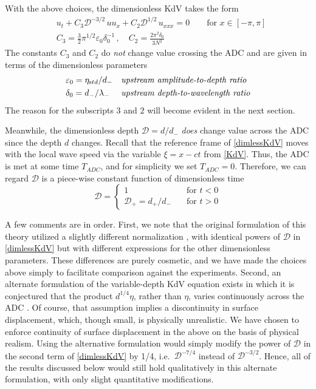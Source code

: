 \documentclass[11pt]{article}
\newcommand{\eps}{\varepsilon}
\newcommand{\etastd}{\eta_{\text std}}
\newcommand{\depth}{d}
\newcommand{\dup}{\depth_{-}}
\newcommand{\ddn}{\depth_{+}}
\newcommand{\lam}{\lambda}
\newcommand{\lamup}{\lam_{-}}
\newcommand{\lamfac}{N}
\newcommand{\drat}{\mathcal{D}}
\newcommand{\dratdn}{\drat_+}
\newcommand{\epsup}{\eps_0}
\newcommand{\delup}{\delta_0}
\begin{document}
With the above choices, the dimensionless KdV takes the form
\begin{align}
\label{dimlessKdV}
&u_t + C_3 \drat^{-3/2} \, u u_x + C_2 \drat^{1/2} \, u_{xxx} = 0
\qquad \text{for } x \in [-\pi,\pi] \\
&C_3 = \frac{3}{2} \pi^{1/2} \epsup \delup^{-1} \, , \quad
C_2 = \frac{2 \pi^2 \delup}{3 \lamfac^2} 
\end{align}
The constants $C_3$ and $C_2$ do {\em not} change value crossing the ADC and are given in terms of the dimensionless parameters
\begin{align}
&\epsup = \etastd / \dup
&&\mbox{\em upstream amplitude-to-depth ratio} \\
&\delup = \dup / \lamup
&&\mbox{\em upstream depth-to-wavelength ratio}
\end{align}
The reason for the subscripts $3$ and $2$ will become evident in the next section. 

Meanwhile, the dimensionless depth $\drat = {\depth}/{\dup}$ {\em does} change value across the ADC since the depth $\depth$ changes. Recall that the reference frame of \eqref{dimlessKdV} moves with the local wave speed via the variable $\xi = x-ct$ from \eqref{KdV}. Thus, the ADC is met at some time $T_{ADC}$, and for simplicity we set $T_{ADC} = 0$. Therefore, we can regard $\drat$ is a piece-wise constant function of dimensionless time
\begin{equation}
\label{dratpw}
\drat = 
\begin{cases}
1 		&\quad \mbox{for } {t}<0 \\
\dratdn = {\ddn}/{\dup} 	&\quad \mbox{for } {t}>0
\end{cases}
\end{equation}

A few comments are in order. First, we note that the original formulation of this theory utilized a slightly different normalization \cite{majda2019statistical}, with identical powers of $\drat$ in \eqref{dimlessKdV} but with different expressions for the other dimensionless parameters. These differences are purely cosmetic, and we have made the choices above simply to facilitate comparison against the experiments. Second, an alternate formulation of the variable-depth KdV equation exists in which it is conjectured that the product $\depth^{1/4} \eta$, rather than $\eta$, varies continuously across the ADC \cite{johnson1997modern}. Of course, that assumption implies a discontinuity in surface displacement, which, though small, is physically unrealistic. We have chosen to enforce continuity of surface displacement in the above on the basis of physical realism. Using the alternative formulation would simply modify the power of $\drat$ in the second term of \eqref{dimlessKdV} by 1/4, i.e.~$\drat^{-7/4}$ instead of $\drat^{-3/2}$. Hence, all of the results discussed below would still hold qualitatively in this alternate formulation, with only slight quantitative modifications.
\end{document}

